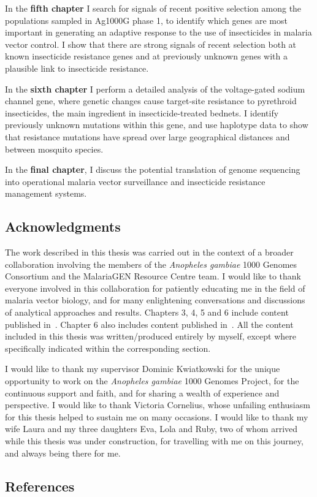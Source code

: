 In the \textbf{fifth chapter} I search for signals of recent positive selection among the populations sampled in Ag1000G phase 1, to identify which genes are most important in generating an adaptive response to the use of insecticides in malaria vector control.
%
I show that there are strong signals of recent selection both at known insecticide resistance genes and at previously unknown genes with a plausible link to insecticide resistance.


In the \textbf{sixth chapter} I perform a detailed analysis of the voltage-gated sodium channel gene, where genetic changes cause target-site resistance to pyrethroid insecticides, the main ingredient in insecticide-treated bednets.
%
I identify previously unknown mutations within this gene, and use haplotype data to show that resistance mutations have spread over large geographical distances and between mosquito species.


In the \textbf{final chapter}, I discuss the potential translation of genome sequencing into operational malaria vector surveillance and insecticide resistance management systems.


\begin{refsection}
\chapter*{Acknowledgments}


The work described in this thesis was carried out in the context of a broader collaboration involving the members of the \textit{Anopheles gambiae} 1000 Genomes Consortium and the MalariaGEN Resource Centre team.
%
I would like to thank everyone involved in this collaboration for patiently educating me in the field of malaria vector biology, and for many enlightening conversations and discussions of analytical approaches and results.
%
Chapters 3, 4, 5 and 6 include content published in~\textcite{Ag1000G2017}.
%
Chapter 6 also includes content published in~\textcite{Clarkson2018}.
%
All the content included in this thesis was written/produced entirely by myself, except where specifically indicated within the corresponding section.


I would like to thank my supervisor Dominic Kwiatkowski for the unique opportunity to work on the \textit{Anopheles gambiae} 1000 Genomes Project, for the continuous support and faith, and for sharing a wealth of experience and perspective.
%
I would like to thank Victoria Cornelius, whose unfailing enthusiasm for this thesis helped to sustain me on many occasions.
%
I would like to thank my wife Laura and my three daughters Eva, Lola and Ruby, two of whom arrived while this thesis was under construction, for travelling with me on this journey, and always being there for me.


\section*{References}




\end{refsection}

